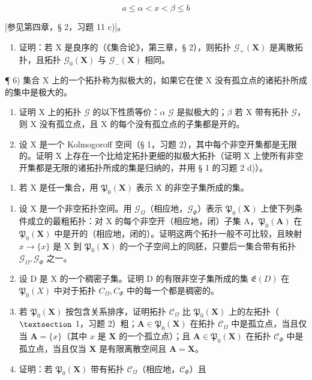 \[
a \leqslant \alpha <   x <   \beta \leqslant b
\]

{[}参见第四章，§ 2，习题 11 c){]}。

\begin{enumerate}
\def\labelenumi{\alph{enumi})}
\setcounter{enumi}{3}
\tightlist
\item
  证明：若 X 是良序的（《集合论》，第三章，§ 2），则拓扑 \(\mathcal{G}_{+}(\mathbf{X})\) 是离散拓扑，且拓扑 \(\mathcal{G}_{0}(\mathbf{X})\) 与 \(\mathcal{G}_{-}(\mathbf{X})\) 相同。
\end{enumerate}

¶ 6) 集合 X 上的一个拓扑称为拟极大的，如果它在使 X 没有孤立点的诸拓扑所成的集中是极大的。

\begin{enumerate}
\def\labelenumi{\alph{enumi})}
\item
  证明 X 上的拓扑 \(\mathcal{G}\) 的以下性质等价：\(\alpha\) \(\mathcal{G}\) 是拟极大的；\(\beta\) 若 X 带有拓扑 \(\mathcal{G}\)，则 X 没有孤立点，且 X 的每个没有孤立点的子集都是开的。
\item
  设 X 是一个 Kolmogoroff 空间（§ 1，习题 2），其中每个非空开集都是无限的。证明 X 上存在一个比给定拓扑更细的拟极大拓扑（证明 X 上使所有非空开集都是无限的诸拓扑所成的集是归纳的，并用 § 1 的习题 2 d)）。
\end{enumerate}

\begin{enumerate}
\def\labelenumi{\arabic{enumi})}
\setcounter{enumi}{6}
\tightlist
\item
  若 X 是任一集合，用 \(\mathfrak{P}_{0}(\mathbf{X})\) 表示 X 的非空子集所成的集。
\end{enumerate}

\begin{enumerate}
\def\labelenumi{\alph{enumi})}
\item
  设 X 是一个非空拓扑空间。用 \(\mathcal{G}_{\Omega}\)（相应地，\(\mathcal{G}_{\Phi}\)）表示 \(\mathfrak{P}_{0}(\mathbf{X})\) 上使下列条件成立的最粗拓扑：对 X 的每个非空开（相应地，闭）子集 A，\(\mathfrak{P}_{0}(\mathbf{A})\) 在 \(\mathfrak{P}_{0}(\mathbf{X})\) 中是开的（相应地，闭的）。证明这两个拓扑一般不可比较，且映射 \(x \to \{x\}\) 是 X 到 \(\mathfrak{P}_{0}(\mathbf{X})\) 的一个子空间上的同胚，只要后一集合带有拓扑 \(\mathcal{G}_{\Omega}, \mathcal{G}_{\Phi}\) 之一。
\item
  设 D 是 X 的一个稠密子集。证明 D 的有限非空子集所成的集 \(\mathfrak{E}(D)\) 在 \(\mathfrak{P}_{0}(X)\) 中对于拓扑 \(C_{\Omega}, C_{\Phi}\) 中的每一个都是稠密的。
\item
  若 \(\mathfrak{P}_{0}(\mathbf{X})\) 按包含关系排序，证明拓扑 \(\mathcal{C}_{\Omega}\) 比 \(\mathfrak{P}_{0}(\mathbf{X})\) 上的左拓扑（\(\S\) 1，习题 2）粗；\(\mathbf{A} \in \mathfrak{P}_{0}(\mathbf{X})\) 在拓扑 \(\mathcal{C}_{\Omega}\) 中是孤立点，当且仅当 \(\mathbf{A} = \{x\}\)（其中 \(x\) 是 \(\mathbf{X}\) 的一个孤立点）；且 \(\mathbf{A} \in \mathfrak{P}_{0}(\mathbf{X})\) 在拓扑 \(\mathcal{C}_{\Phi}\) 中是孤立点，当且仅当 \(\mathbf{X}\) 是有限离散空间且 \(\mathbf{A} = \mathbf{X}\)。
\item
  证明：若 \(\mathfrak{P}_0(\mathbf{X})\) 带有拓扑 \(\mathcal{C}_{\Omega}\)（相应地，\(\mathcal{C}_{\Phi}\)）且
\end{enumerate}

